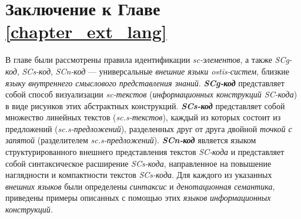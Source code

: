 \section*{Заключение к Главе \ref{chapter_ext_lang}}
В главе были рассмотрены правила идентификации \textit{sc-элементов}, а также \textit{SCg-код}, \textit{SCs-код}, \textit{SCn-код} --- универсальные \textit{внешние языки ostis-систем}, близкие \textit{языку внутреннего смыслового представления знаний}.
\textbf{\textit{SCg-код}} представляет собой способ визуализации \textit{sc-текстов} (\textit{информационных конструкций SC-кода}) в виде рисунков этих абстрактных конструкций.
\textbf{\textit{SCs-код}} представляет собой множество линейных текстов (\textit{sc.s-текстов}), каждый из которых состоит из предложений (\textit{sc.s-предложений}), разделенных друг от друга двойной \textit{точкой с запятой} (разделителем \textit{sc.s-предложений}).
\textbf{\textit{SCn-код}} является языком структурированного внешнего представления текстов \textit{SC-кода} и представляет собой синтаксическое расширение \textit{SCs-кода}, направленное на повышение наглядности и компактности текстов \textit{SCs-кода}.
Для каждого из указанных \textit{внешних языков} были определены \textit{синтаксис} и \textit{денотационная семантика}, приведены примеры описанных с помощью этих \textit{языков} \textit{информационных конструкций}.
%